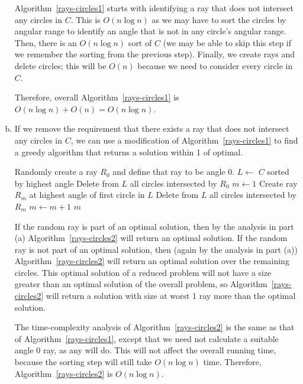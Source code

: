 \begin{enumerate}[(a)]
	Algorithm~\ref{rays-circles1} starts with identifying a ray that does not intersect any circles in $C$. This is $O(n \log n)$ as we may have to sort the circles by angular range to identify an angle that is not in any circle's angular range. Then, there is an $O(n \log n)$ sort of $C$ (we may be able to skip this step if we remember the sorting from the previous step). Finally, we create rays and delete circles; this will be $O(n)$ because we need to consider every circle in $C$.
	
	Therefore, overall Algorithm~\ref{rays-circles1} is $O(n \log n) + O(n) = O(n \log n)$.
	
	\item If we remove the requirement that there exists a ray that does not intersect any circles in $C$, we can use a modification of Algorithm~\ref{rays-circles1} to find a greedy algorithm that returns a solution within 1 of optimal. 
	
	\begin{algorithm}
		\caption{}
		\label{rays-circles2}
		\begin{algorithmic}
			\State Randomly create a ray $R_{0}$ and define that ray to be angle 0.
			\State $L \gets$ $C$ sorted by highest angle
			\State Delete from $L$ all circles intersected by $R_{0}$
			\State $m \gets 1$
				\State Create ray $R_{m}$ at highest angle of first circle in $L$
				\State Delete from $L$ all circles intersected by $R_{m}$
				\State $m \gets m+1$
			\EndWhile
			\State \Return $m$
		\end{algorithmic}
	\end{algorithm}
	
	If the random ray is part of an optimal solution, then by the analysis in part (a) Algorithm~\ref{rays-circles2} will return an optimal solution. If the random ray is not part of an optimal solution, then (again by the analysis in part (a)) Algorithm~\ref{rays-circles2} will return an optimal solution over the remaining circles. This optimal solution of a reduced problem will not have a size greater than an optimal solution of the overall problem, so Algorithm~\ref{rays-circles2} will return a solution with size at worst 1 ray more than the optimal solution.
	
	The time-complexity analysis of Algorithm~\ref{rays-circles2} is the same as that of Algorithm~\ref{rays-circles1}, except that we need not calculate a suitable angle 0 ray, as any will do. This will not affect the overall running time, because the sorting step will still take $O(n \log n)$ time. Therefore, Algorithm~\ref{rays-circles2} is $O(n \log n)$.
	
\end{enumerate}